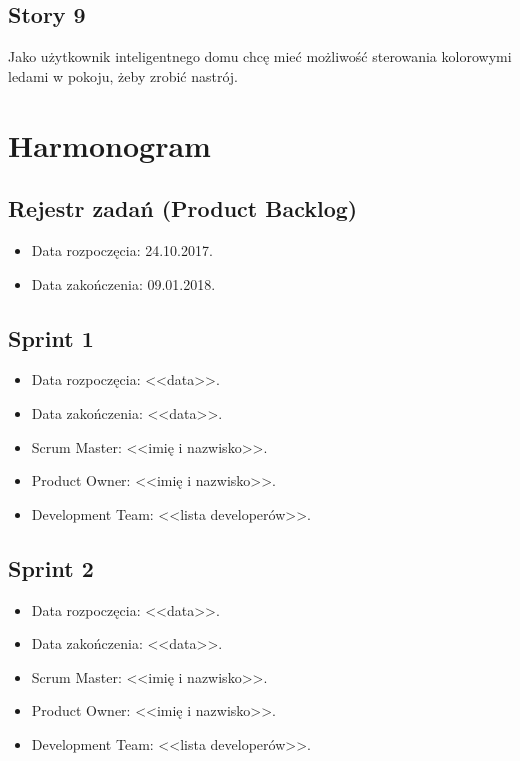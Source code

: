 	\subsection{Story 9}
	Jako użytkownik inteligentnego domu chcę mieć możliwość sterowania kolorowymi ledami w pokoju, żeby zrobić nastrój.
	
	
	\section{Harmonogram}
	
	\subsection{Rejestr zadań (Product Backlog)}
	
	\begin{itemize}
		\item Data rozpoczęcia: 24.10.2017.
		\item  Data zakończenia: 09.01.2018.
	\end{itemize}
\subsection{Sprint 1}

\begin{itemize}
	\item Data rozpoczęcia: <<data>>.
	\item Data zakończenia: <<data>>.
	\item Scrum Master: <<imię i nazwisko>>.
	\item Product Owner: <<imię i nazwisko>>.
	\item Development Team: <<lista developerów>>.
\end{itemize}

\subsection{Sprint 2}

\begin{itemize}
	\item Data rozpoczęcia: <<data>>.
	\item  Data zakończenia: <<data>>.
	\item Scrum Master: <<imię i nazwisko>>.
	\item Product Owner: <<imię i nazwisko>>.
	\item Development Team: <<lista developerów>>.
\end{itemize}